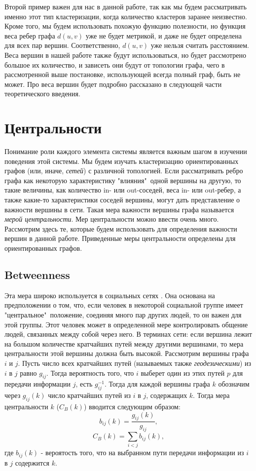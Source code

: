 Второй пример важен для нас в данной работе, так как мы будем рассматривать именно этот тип кластеризации, когда количество кластеров заранее неизвестно. Кроме того, мы будем использовать похожую функцию полезности, но функция веса ребер графа $d(u, v)$ уже не будет метрикой, и даже не будет определена для всех пар вершин. Соответственно, $d(u, v)$ уже нельзя считать расстоянием. Веса вершин в нашей работе также будут использоваться, но будет рассмотрено большое их количество, и зависеть они будут от топологии графа, чего в рассмотренной выше постановке, использующей всегда полный граф, быть не может. Про веса вершин будет подробно рассказано в следующей части теоретического введения. 

\section{Центральности}

Понимание роли каждого элемента системы является важным шагом в изучении поведения этой системы. Мы будем изучать кластеризацию ориентированных графов (или, иначе, \textit{сетей}) с различной топологией. Если рассматривать ребро графа как некоторую характеристику "влияния"\ одной вершины на другую, то такие величины, как количество in- или out-соседей, веса in- или out-ребер, а также какие-то характеристики соседей вершины, могут дать представление о важности вершины в сети. Такая мера важности вершины графа называется \textit{мерой центральности}. Мер центральности можно ввести очень много. Рассмотрим здесь те, которые будем использовать для определения важности вершин в данной работе. Приведенные меры центральности определены для ориентированных графов.

\subsection{Betweenness}
Эта мера широко используется в социальных сетях \cite{betweenness}. Она основана на предположении о том, что, если человек в некоторой социальной группе имеет "центральное"\ положение, соединяя много пар других людей, то он важен для этой группы. Этот человек может в определенной мере контролировать общение людей, связанных между собой через него. В терминах сети: если вершина лежит на большом количестве кратчайших путей между другими вершинами, то мера центральности этой вершины должна быть высокой. Рассмотрим вершины графа $i$ и $j$. Пусть число всех кратчайших путей (называемых также \textit{геодезическими}) из $i$ в $j$ равно $g_{ij}$. Тогда вероятность того, что $i$ выберет один из этих путей $p$ для передачи информации $j$, есть $g_{ij}^{-1}$. Тогда для каждой вершины графа $k$ обозначим через $g_{ij}(k)$ число кратчайших путей из $i$ в $j$, содержащих $k$. Тогда мера центральности $k$ ($C_B(k)$) вводится следующим образом:
	\begin{equation}
	b_{ij}(k) = \frac{g_{ij}(k)}{g_{ij}},
	\end{equation}
	\begin{equation}
	C_B(k) = \sum_{i<j}b_{ij}(k),
	\end{equation}
	где $b_{ij}(k)$ - вероятость того, что на выбранном пути передачи информации из $i$ в $j$ содержится $k$. 
	
